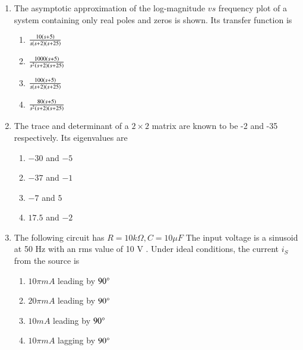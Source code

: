 \documentclass[journal,9pt,onecolumn]{IEEEtran}
\begin{document}
\begin{enumerate}
\item The asymptotic approximation of the log-magnitude $v s$ frequency plot of a system containing only real poles and zeros is shown. Its transfer function is
\begin{center}
    
\end{center}
\begin{multicols}{4}    
\begin{enumerate}
    \item $\frac{10\left(s+5\right)}{s\left(s+2\right)\left(s+25\right)}$
    \item $\frac{1000\left(s+5\right)}{s^{2}\left(s+2\right)\left(s+25\right)}$
    \item $\frac{100\left(s+5\right)}{s\left(s+2\right)\left(s+25\right)}$
    \item $\frac{80\left(s+5\right)}{s^{2}\left(s+2\right)\left(s+25\right)}$
\end{enumerate}
\end{multicols}


\item The trace and determinant of a $2 \times 2$ matrix are known to be -2 and -35 respectively. Its eigenvalues are
\begin{multicols}{4}
\begin{enumerate}
    \item $-30$ and $-5$
    \item $-37$ and $-1$
    \item $-7$ and $5$
    \item $17.5$ and $-2$
\end{enumerate}
\end{multicols}


\item The following circuit has $R=10 k \Omega, C=10 \mu  F$ The input voltage is a sinusoid at 50 Hz with an rms value of 10 V . Under ideal conditions, the current $i_{S}$ from the source is
\begin{center}
    
\end{center}
\begin{multicols}{2}
\begin{enumerate}
    \item $10 \pi   mA$ leading by $90\degree$
    \item $20 \pi   mA$ leading by $90\degree$
    \item $10   mA$ leading by $90\degree$
    \item $10 \pi   mA$ lagging by $90\degree$
\end{enumerate}
\end{multicols}


\end{enumerate}
\end{document}
